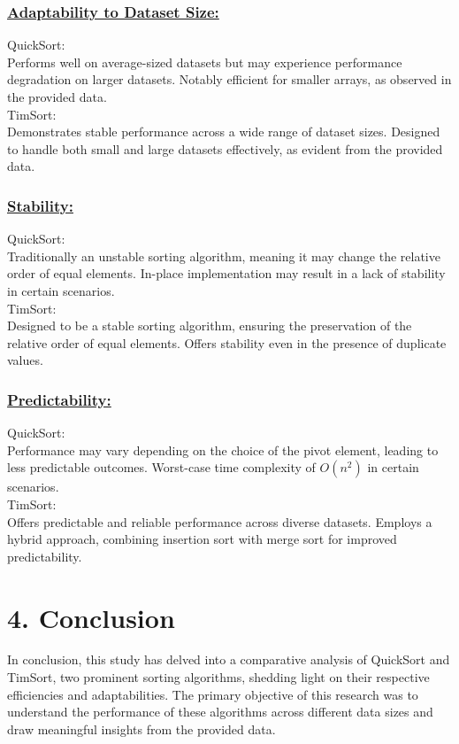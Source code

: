 \documentclass[a4paper, 9pt, twocolumn]{article}
\begin{document}
\subsubsection*{\underline{Adaptability to Dataset Size:}}
QuickSort:\\
Performs well on average-sized datasets but may experience performance degradation on larger datasets.
Notably efficient for smaller arrays, as observed in the provided data.\\
TimSort:\\
Demonstrates stable performance across a wide range of dataset sizes.
Designed to handle both small and large datasets effectively, as evident from the provided data.

\subsubsection*{\underline{Stability:}}
QuickSort:\\
Traditionally an unstable sorting algorithm, meaning it may change the relative order of equal elements.
In-place implementation may result in a lack of stability in certain scenarios.\\
TimSort:\\
Designed to be a stable sorting algorithm, ensuring the preservation of the relative order of equal elements.
Offers stability even in the presence of duplicate values.

\subsubsection*{\underline{Predictability:}}
QuickSort:\\
Performance may vary depending on the choice of the pivot element, leading to less predictable outcomes.
Worst-case time complexity of $O(n^2)$ in certain scenarios.\\
TimSort:\\
Offers predictable and reliable performance across diverse datasets.
Employs a hybrid approach, combining insertion sort with merge sort for improved predictability.

\section*{4. Conclusion}

In conclusion, this study has delved into a comparative analysis of QuickSort and TimSort, two prominent sorting algorithms, shedding light on their respective efficiencies and adaptabilities. The primary objective of this research was to understand the performance of these algorithms across different data sizes and draw meaningful insights from the provided data.
\end{document}
